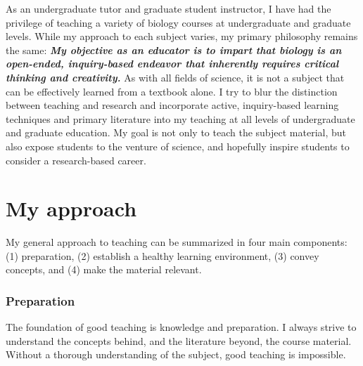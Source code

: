 \documentclass[10pt]{article}
\begin{document}
\raggedright
\singlespacing

As an undergraduate tutor and graduate student instructor, I have had the privilege of teaching a variety of biology courses at undergraduate and graduate levels.
While my approach to each subject varies, my primary philosophy remains the same:
\textbf{\textit{My objective as an educator is to impart that biology is an open-ended, inquiry-based endeavor that inherently requires critical thinking and creativity.}}
As with all fields of science, it is not a subject that can be effectively learned from a textbook alone.
I try to blur the distinction between teaching and research and incorporate active, inquiry-based learning techniques and primary literature into my teaching at all levels of undergraduate and graduate education.
My goal is not only to teach the subject material, but also expose students to the venture of science, and hopefully inspire students to consider a research-based career. 

\section*{My approach}
My general approach to teaching can be summarized in four main components:
(1) preparation,
(2) establish a healthy learning environment,
(3) convey concepts, and
(4) make the material relevant.

\subsubsection*{Preparation}
The foundation of good teaching is knowledge and preparation.
I always strive to understand the concepts behind, and the literature beyond, the course material.
Without a thorough understanding of the subject, good teaching is impossible.
\end{document}
